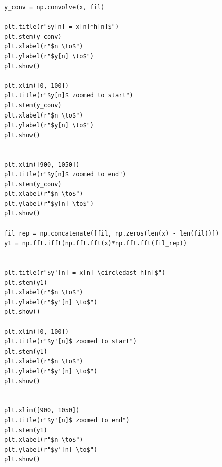 \documentclass[11pt, a4paper]{article}
\begin{document}
\begin{lstlisting}
y_conv = np.convolve(x, fil)

plt.title(r"$y[n] = x[n]*h[n]$")
plt.stem(y_conv)
plt.xlabel(r"$n \to$")
plt.ylabel(r"$y[n] \to$")
plt.show()

plt.xlim([0, 100])
plt.title(r"$y[n]$ zoomed to start")
plt.stem(y_conv)
plt.xlabel(r"$n \to$")
plt.ylabel(r"$y[n] \to$")
plt.show()


plt.xlim([900, 1050])
plt.title(r"$y[n]$ zoomed to end")
plt.stem(y_conv)
plt.xlabel(r"$n \to$")
plt.ylabel(r"$y[n] \to$")
plt.show()

fil_rep = np.concatenate([fil, np.zeros(len(x) - len(fil))])
y1 = np.fft.ifft(np.fft.fft(x)*np.fft.fft(fil_rep))


plt.title(r"$y'[n] = x[n] \circledast h[n]$")
plt.stem(y1)
plt.xlabel(r"$n \to$")
plt.ylabel(r"$y'[n] \to$")
plt.show()

plt.xlim([0, 100])
plt.title(r"$y'[n]$ zoomed to start")
plt.stem(y1)
plt.xlabel(r"$n \to$")
plt.ylabel(r"$y'[n] \to$")
plt.show()


plt.xlim([900, 1050])
plt.title(r"$y'[n]$ zoomed to end")
plt.stem(y1)
plt.xlabel(r"$n \to$")
plt.ylabel(r"$y'[n] \to$")
plt.show()
  \end{lstlisting}
\newpage
\end{document}
